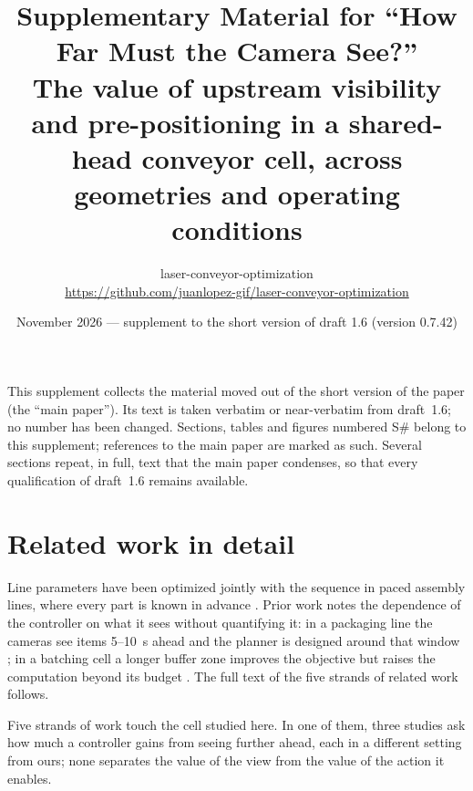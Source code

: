 \documentclass[11pt,a4paper]{article}
\title{\textbf{Supplementary Material for ``How Far Must the Camera See?''}\\[0.3em]
\large The value of upstream visibility and pre-positioning in a shared-head conveyor cell,
across geometries and operating conditions}
\author{laser-conveyor-optimization\\\small\url{https://github.com/juanlopez-gif/laser-conveyor-optimization}}
\date{November 2026 --- supplement to the short version of draft 1.6 (version 0.7.42)}
\begin{document}
\maketitle

This supplement collects the material moved out of the short version of the paper (the
``main paper''). Its text is taken verbatim or near-verbatim from draft~1.6; no number has
been changed. Sections, tables and figures numbered S\# belong to this supplement;
references to the main paper are marked as such. Several sections repeat, in full, text
that the main paper condenses, so that every qualification of draft~1.6 remains available.

\section{Related work in detail}\label{sup:related}
Line parameters have been optimized jointly with the sequence in paced assembly lines,
where every part is known in advance \cite{Sarker2001}. Prior work notes the dependence of
the controller on what it sees without quantifying it: in a packaging line the cameras
see items 5--10~s ahead and the planner is designed around that window
\cite{S04_Schettini2023}; in a batching cell a longer buffer zone improves the objective
but raises the computation beyond its budget \cite{S03_Nielsen2023}. The full text of the
five strands of related work follows.

Five strands of work touch the cell studied here. In one of them, three studies ask how
much a controller gains from seeing further ahead, each in a different setting from ours;
none separates the value of the view from the value of the action it enables.
\end{document}
